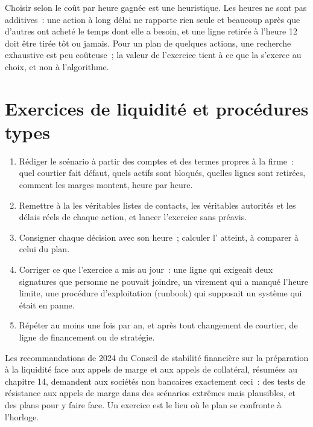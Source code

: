 \begin{remark}\label{rem:fm:crisis-management:greedy}
Choisir selon le coût par heure gagnée est une heuristique. Les heures ne sont pas additives~: une action à long délai ne rapporte rien seule et beaucoup après
que d'autres ont acheté le temps dont elle a besoin, et une ligne retirée à l'heure 12 doit être tirée tôt ou jamais. Pour un plan de quelques actions, une
recherche exhaustive est peu coûteuse~; la valeur de l'exercice tient à ce que la  s'exerce au choix, et non à l'algorithme.
\end{remark}

\section{Exercices de liquidité et procédures types}

\begin{method}\label{met:fm:crisis-management:drill}
\begin{enumerate}
\item Rédiger le scénario à partir des comptes et des termes propres à la firme~: quel courtier fait défaut, quels actifs sont bloqués, quelles lignes sont retirées, comment les marges montent, heure par
heure.
\item Remettre à la  les véritables listes de contacts, les véritables autorités et les délais réels de chaque action, et lancer l'exercice sans préavis.
\item Consigner chaque décision avec son heure~; calculer l' atteint, à comparer à celui du plan.
\item Corriger ce que l'exercice a mis au jour~: une ligne qui exigeait deux signatures que personne ne pouvait joindre, un virement qui a manqué l'heure limite, une procédure d'exploitation (runbook) qui supposait
un système qui était en panne.
\item Répéter au moins une fois par an, et après tout changement de courtier, de ligne de financement ou de stratégie.
\end{enumerate}
\end{method}

Les recommandations de 2024 du Conseil de stabilité financière sur la préparation à la liquidité face aux appels de marge et aux appels de collatéral, résumées au chapitre 14, demandent
aux sociétés non bancaires exactement ceci~: des tests de résistance aux appels de marge dans des scénarios extrêmes mais plausibles, et des plans pour y faire face. Un exercice est le lieu où le
plan se confronte à l'horloge.


